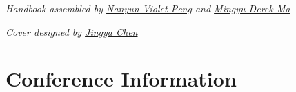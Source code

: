 \documentclass[twoside,makeidx]{book}
\begin{document}

\thispagestyle{empty}
\fancyfoot[C]{}
% 




\thispagestyle{empty}

% 

\vspace*{15.3em}
\noindent\emph{Handbook assembled by \href{https://vnpeng.net}{Nanyun Violet Peng} and \href{https://mingyu.ma}{Mingyu Derek Ma}}\\ 

\noindent\emph{Cover designed by \href{https://jingyachen.net}{Jingya Chen}}\\

\newpage
\cleardoublepage
\fancyfoot[C]{\thepage}
\frontmatter





\setcounter{tocdepth}{1}
\tableofcontents
\mainmatter
\pagestyle{fancy}


\chapter{Conference Information}


\clearpage


\clearpage%
\setheaders{}{}


\clearpage

\end{document}
